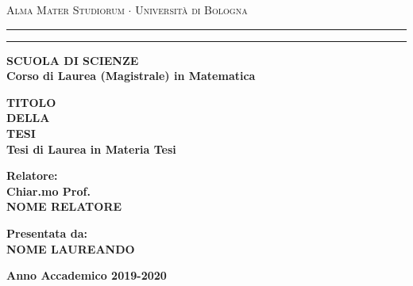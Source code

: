 ﻿\documentclass[12pt,a4paper]{report}
\begin{document}
	\begin{titlepage}
		\begin{center}
			{
				{\Large
					{\textsc{
						Alma Mater Studiorum $\cdot$ Università di Bologna
					}}
				}
			}
			\rule[0.1cm]{15.8cm}{0.1mm}
			\rule[0.5cm]{15.8cm}{0.6mm}
			{\small
				{\bf 
					SCUOLA DI SCIENZE\\
					Corso di Laurea (Magistrale) in Matematica %
				}
			}
			\end{center}
			\vspace{15mm}
			\begin{center}
				{\LARGE{\bf TITOLO}}\\
				\vspace{3mm}
				{\LARGE{\bf DELLA}}\\
				\vspace{3mm}
				{\LARGE{\bf TESI}}\\
				\vspace{19mm}
				{\large
					{\bf
						Tesi di Laurea in Materia Tesi
					}
				}
			\end{center}
			\vspace{40mm}
			\par
			\noindent
			\begin{minipage}[t]{0.47\textwidth}
				{\large
					{\bf
						Relatore:\\
						Chiar.mo Prof.\\
						NOME RELATORE
					}
				}
			\end{minipage}
			\hfill
			\begin{minipage}[t]{0.47\textwidth}\raggedleft
				{\large
					{\bf 
						Presentata da:\\
						NOME LAUREANDO
					}
				}
			\end{minipage}
			\vspace{30mm}
			\begin{center}
			{\large
				{\bf 
					Anno Accademico 2019-2020 %
				}
			}
		\end{center}
	\end{titlepage}
\end{document}
